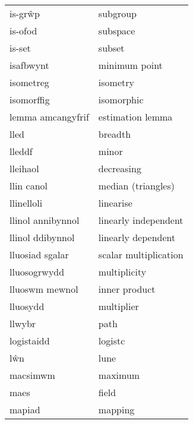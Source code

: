 \begin{supertabular}{p{0.22\textwidth}p{0.22\textwidth}}
                        is-grŵp &                         subgroup \\
                        is-ofod &                         subspace \\
                         is-set &                           subset \\
                      isafbwynt &                    minimum point \\
                      isometreg &                         isometry \\
                     isomorffig &                       isomorphic \\
              lemma amcangyfrif &                 estimation lemma \\
                           lled &                          breadth \\
                         lleddf &                            minor \\
                       lleihaol &                       decreasing \\
                     llin canol &               median (triangles) \\
                     llinelloli &                        linearise \\
              llinol annibynnol &             linearly independent \\
               llinol ddibynnol &               linearly dependent \\
                lluosiad sgalar &            scalar multiplication \\
                   lluosogrwydd &                     multiplicity \\
                 lluoswm mewnol &                    inner product \\
                       lluosydd &                       multiplier \\
                         llwybr &                             path \\
                     logistaidd &                          logistc \\
                            lŵn &                             lune \\
                       macsimwm &                          maximum \\
                           maes &                            field \\
                         mapiad &                          mapping \\

\end{supertabular}
